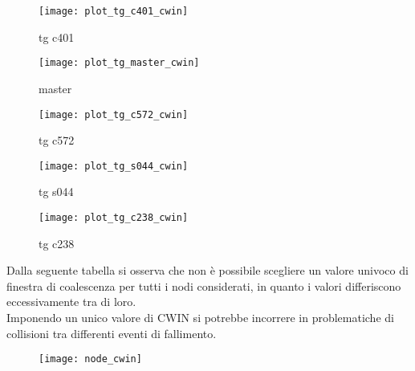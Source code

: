 \begin{minipage}{\linewidth}
  \centering
  \begin{minipage}{0.49\linewidth}
    \begin{figure}[H]
      \texttt{[image: plot\_tg\_c401\_cwin]}
      \caption*{tg c401}
    \end{figure}
  \end{minipage}
  \begin{minipage}{0.49\linewidth}
    \begin{figure}[H]
      \texttt{[image: plot\_tg\_master\_cwin]}
      \caption*{master}
    \end{figure}
  \end{minipage}
  \begin{minipage}{0.49\linewidth}
    \begin{figure}[H]
      \texttt{[image: plot\_tg\_c572\_cwin]}
      \caption*{tg c572}
    \end{figure}
  \end{minipage}
  \begin{minipage}{0.49\linewidth}
    \begin{figure}[H]
      \texttt{[image: plot\_tg\_s044\_cwin]}
      \caption*{tg s044}
    \end{figure}
  \end{minipage}
  \begin{minipage}{0.49\linewidth}
    \hspace{0.25\linewidth}
    \begin{figure}[H]
      \texttt{[image: plot\_tg\_c238\_cwin]}
      \caption*{tg c238}
    \end{figure}
  \end{minipage}
\end{minipage}
\label{ffda_cwin_5_nodi}

\clearpage

Dalla seguente tabella si osserva che non è possibile scegliere un
valore univoco di finestra di coalescenza per tutti i nodi considerati, in quanto
i valori differiscono eccessivamente tra di loro.\\
Imponendo un unico valore di CWIN si potrebbe incorrere in problematiche di
collisioni tra differenti eventi di fallimento.\\

\begin{figure}[!htbp]
  \centering
  \texttt{[image: node\_cwin]}
\end{figure}

